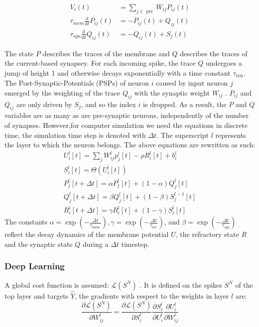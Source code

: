 \documentclass[12pt]{report}
\begin{document}
\begin{equation}
\begin{aligned}
V_{i}(t) &=\sum_{j \in \text { pre }} W_{i j} P_{i j}(t) \\
\tau_{m e m} \frac{\mathrm{d}}{\mathrm{d} t} P_{i j}(t) &=-P_{i j}(t)+Q_{i j}(t) \\
\tau_{s y n} \frac{\mathrm{d}}{\mathrm{d} t} Q_{i j}(t) &=-Q_{i j}(t)+S_{j}(t)
\end{aligned}
\end{equation}


The state $P$ describes the traces of the membrane and $Q$ describes the traces of the current-based synapsey. For each incoming spike, the trace $Q$ undergoes a jump of height 1 and otherwise decays exponentially with a time constant $\tau_{\mathrm{syn}}$. The Post-Synaptic-Potentials (PSPs) of neuron $i$ caused by input neuron $j$ emerged by the weighting of the trace $Q_{i j}$ with the synaptic weight $W_{i j}$ . $P_{i j}$ and $Q_{i j}$ are only driven by $S_{j}$, and so the index $i$ is dropped. As a result, the $P$ and $Q$ variables are as many as are pre-synaptic neurons, independently of the number of synapses. 
However,for computer simulation we need the equations in discrete time, the simulation time step is denoted with $\Delta t$. The superscript $l$ represents the layer to which the neuron belongs. The above equations are rewritten as such:
\begin{equation}
\begin{aligned}
U_{i}^{l}[t]=\sum_{j} W_{i j}^{l} p_{j}^{l}[t]-\rho R_{i}^{l}[t]+b_{i}^{l} \\
S_{i}^{l}[t]=\Theta\left(U_{i}^{l}[t]\right) \\
P_{j}^{l}[t+\Delta t]=\alpha P_{j}^{l}[t]+(1-\alpha) Q_{j}^{l}[t] \\
Q_{j}^{l}[t+\Delta t]=\beta Q_{j}^{l}[t]+(1-\beta) S_{j}^{l-1}[t] \\
R_{i}^{l}[t+\Delta t]=\gamma R_{i}^{l}[t]+(1-\gamma) S_{i}^{l}[t]
\end{aligned}
\end{equation}
The constants $\alpha=\exp \left(-\frac{\Delta t}{\tau_{\text {mem }}}\right), \gamma=\exp \left(-\frac{\Delta t}{\tau_{\text {ref }}}\right)$, and $\beta=\exp \left(-\frac{\Delta t}{\tau_{s y n}}\right)$ reflect the decay dynamics of the membrane potential $U$, the refractory state $R$ and the synaptic state $Q$ during a $\Delta t$ timestep.
\subsubsection{Deep Learning}
A global cost function is assumed: $\mathcal{L}\left(S^{N}\right)$ . It is defined on the spikes $S^{N}$ of the top layer and targets $\hat{Y}$, the gradients with respect to the weights in layer $l$ are:
\begin{equation}
\frac{\partial \mathcal{L}\left(S^{N}\right)}{\partial W_{i j}^{l}}=\frac{\partial \mathcal{L}\left(S^{N}\right)}{\partial S_{i}^{l}} \frac{\partial S_{i}^{l}}{\partial U_{i}^{l}} \frac{\partial U_{i}^{l}}{\partial W_{i j}^{l}}
\end{equation}
\end{document}
